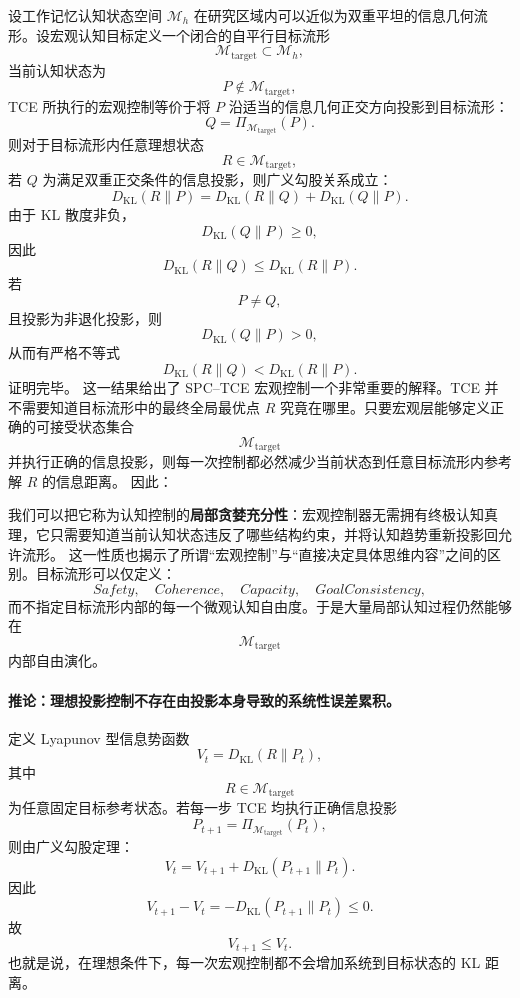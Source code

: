 设工作记忆认知状态空间 $\mathcal{M}_{h}$ 在研究区域内可以近似为双重平坦的信息几何流形。设宏观认知目标定义一个闭合的自平行目标流形
\[
\mathcal{M}_{\mathrm{target}}
\subset
\mathcal{M}_{h},
\]
当前认知状态为
\[
P\notin\mathcal{M}_{\mathrm{target}},
\]
TCE 所执行的宏观控制等价于将 $P$ 沿适当的信息几何正交方向投影到目标流形：
\[
Q
=
\Pi_{\mathcal{M}_{\mathrm{target}}}(P).
\]
则对于目标流形内任意理想状态
\[
R\in\mathcal{M}_{\mathrm{target}},
\]
若 $Q$ 为满足双重正交条件的信息投影，则广义勾股关系成立：
\[
\boxed{
D_{\mathrm{KL}}(R\|P)
=
D_{\mathrm{KL}}(R\|Q)
+
D_{\mathrm{KL}}(Q\|P).
}
\label{eq:generalized-pythagorean-cognitive-control}
\]
由于 KL 散度非负，
\[
D_{\mathrm{KL}}(Q\|P)\ge 0,
\]
因此
\[
D_{\mathrm{KL}}(R\|Q)
\le
D_{\mathrm{KL}}(R\|P).
\]
若
\[
P\neq Q,
\]
且投影为非退化投影，则
\[
D_{\mathrm{KL}}(Q\|P)>0,
\]
从而有严格不等式
\[
\boxed{
D_{\mathrm{KL}}(R\|Q)
<
D_{\mathrm{KL}}(R\|P).
}
\label{eq:projection-monotonic-decrease}
\]
证明完毕。
这一结果给出了 SPC--TCE 宏观控制一个非常重要的解释。TCE 并不需要知道目标流形中的最终全局最优点 $R$ 究竟在哪里。只要宏观层能够定义正确的可接受状态集合
\[
\mathcal{M}_{\mathrm{target}}
\]
并执行正确的信息投影，则每一次控制都必然减少当前状态到任意目标流形内参考解 $R$ 的信息距离。
因此：
\begin{statementbox}
\centering
{}
\end{statementbox}
我们可以把它称为认知控制的\textbf{局部贪婪充分性}：宏观控制器无需拥有终极认知真理，它只需要知道当前认知状态违反了哪些结构约束，并将认知趋势重新投影回允许流形。
这一性质也揭示了所谓``宏观控制''与``直接决定具体思维内容''之间的区别。目标流形可以仅定义：
\[
Safety,
\quad
Coherence,
\quad
Capacity,
\quad
GoalConsistency,
\]
而不指定目标流形内部的每一个微观认知自由度。于是大量局部认知过程仍然能够在
\[
\mathcal{M}_{\mathrm{target}}
\]
内部自由演化。
\paragraph{推论：理想投影控制不存在由投影本身导致的系统性误差累积。}
定义 Lyapunov 型信息势函数
\[
V_t
=
D_{\mathrm{KL}}(R\|P_t),
\]
其中
\[
R\in\mathcal{M}_{\mathrm{target}}
\]
为任意固定目标参考状态。若每一步 TCE 均执行正确信息投影
\[
P_{t+1}
=
\Pi_{\mathcal{M}_{\mathrm{target}}}(P_t),
\]
则由广义勾股定理：
\[
V_t
=
V_{t+1}
+
D_{\mathrm{KL}}(P_{t+1}\|P_t).
\]
因此
\[
V_{t+1}-V_t
=
-
D_{\mathrm{KL}}(P_{t+1}\|P_t)
\le 0.
\]
故
\[
\boxed{
V_{t+1}\le V_t.
}
\]
也就是说，在理想条件下，每一次宏观控制都不会增加系统到目标状态的 KL 距离。

